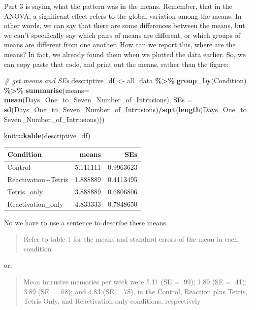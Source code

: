\documentclass[
]{book}
\newenvironment{Shaded}{\begin{snugshade}}{\end{snugshade}}
\newcommand{\AttributeTok}[1]{\textcolor[rgb]{0.13,0.29,0.53}{#1}}
\newcommand{\CommentTok}[1]{\textcolor[rgb]{0.56,0.35,0.01}{\textit{#1}}}
\newcommand{\FunctionTok}[1]{\textcolor[rgb]{0.13,0.29,0.53}{\textbf{#1}}}
\newcommand{\NormalTok}[1]{#1}
\newcommand{\OtherTok}[1]{\textcolor[rgb]{0.56,0.35,0.01}{#1}}
\newcommand{\SpecialCharTok}[1]{\textcolor[rgb]{0.81,0.36,0.00}{\textbf{#1}}}
\begin{document}
Part 3 is saying what the pattern was in the means. Remember, that in the ANOVA, a significant effect refers to the global variation among the means. In other words, we can say that there are some differences between the means, but we can't specifically say which pairs of means are different, or which groups of means are different from one another. How can we report this, where are the means? In fact, we already found them when we plotted the data earlier. So, we can copy paste that code, and print out the means, rather than the figure:

\begin{Shaded}
\begin{Highlighting}[]
\CommentTok{\# get means and SEs}
\NormalTok{descriptive\_df }\OtherTok{\textless{}{-}}\NormalTok{ all\_data }\SpecialCharTok{\%\textgreater{}\%} 
                    \FunctionTok{group\_by}\NormalTok{(Condition) }\SpecialCharTok{\%\textgreater{}\%} 
                    \FunctionTok{summarise}\NormalTok{(}\AttributeTok{means=} \FunctionTok{mean}\NormalTok{(Days\_One\_to\_Seven\_Number\_of\_Intrusions),}
                              \AttributeTok{SEs =} \FunctionTok{sd}\NormalTok{(Days\_One\_to\_Seven\_Number\_of\_Intrusions)}\SpecialCharTok{/}\FunctionTok{sqrt}\NormalTok{(}\FunctionTok{length}\NormalTok{(Days\_One\_to\_Seven\_Number\_of\_Intrusions)))}

\NormalTok{knitr}\SpecialCharTok{::}\FunctionTok{kable}\NormalTok{(descriptive\_df)}
\end{Highlighting}
\end{Shaded}

\begin{tabular}{l|r|r}
\hline
Condition & means & SEs\\
\hline
Control & 5.111111 & 0.9963623\\
\hline
Reactivation+Tetris & 1.888889 & 0.4113495\\
\hline
Tetris\_only & 3.888889 & 0.6806806\\
\hline
Reactivation\_only & 4.833333 & 0.7848650\\
\hline
\end{tabular}

No we have to use a sentence to describe these means.

\begin{quote}
Refer to table 1 for the means and standard errors of the mean in each condition
\end{quote}

or,

\begin{quote}
Mean intrusive memories per week were 5.11 (SE = .99); 1.89 (SE = .41); 3.89 (SE = .68); and 4.83 (SE= .78), in the Control, Reaction plus Tetris, Tetris Only, and Reactivation only conditions, respectively
\end{quote}
\end{document}
